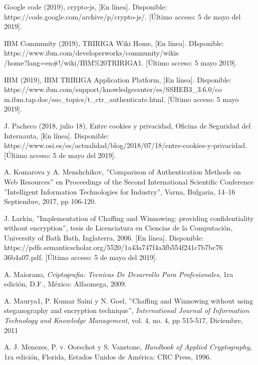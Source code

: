 \documentclass[12pt, a4paper, titlepage]{report}
\begin{document}
\begin{thebibliography}{20}
        Google code (2019), crypto-js, [En línea]. Disponible: https://code.google.com/archive/p/crypto-js/. [Último acceso: 5 de mayo del 2019].
		
        IBM Community (2019), TRIRIGA Wiki Home, [En línea]. DIsponible: 	https://www.ibm.com/developerworks/community/wikis\\
        /home?lang=en\#!/wiki/IBM\%20TRIRIGA1. [Último acceso: 5 mayo 2019].
        
        IBM (2019), IBM TRIRIGA Application Platform, [En línea]. Disponible: https://www.ibm.com/support/knowledgecenter/es/SSHEB3\_3.6.0/co m.ibm.tap.doc/sso\_topics/t\_ctr\_authenticate.html. [Último acceso: 5 mayo 2019].
		
		J. Pacheco (2018, julio 18), Entre cookies y privacidad,  Oficina de Seguridad del Internauta, [En línea]. Disponible: https://www.osi.es/es/actualidad/blog/2018/07/18/entre-cookies-y-privacidad. [Último acceso: 5 de mayo del 2019].
		
	    A. Komarova y A. Menshchikov, ''Comparison of Authentication Methods on Web Resources'' en Proceedings of the Second International Scientific Conference ''Intelligent Information Technologies for Industry'', Varna, Bulgaria, 14–16 Septiembre, 2017, pp 106-120.
	    
    	J. Larkin, ''Implementation of Chaffing and Winnowing: providing confidentiality without encryption'', tesis de Licenciatura en Ciencias de la Computación, University of Bath Bath, Inglaterra, 2006. [En línea]. Disponible: 
    	https://pdfs.semanticscholar.org/5520/1a43a747f4a3fb554f241c7b7bc76 36b4a07.pdf. [Último acceso: 5 de mayo del 2019].
		
        A. Maiorano, \textit{Criptografia: Tecnicas De Desarrollo Para Profesionales}, 1ra edición, D.F., México: Alfaomega, 2009.
		
    	A. Maurya1, P. Kumar Saini y N. Goel, ''Chaffing and Winnowing without using steganography and encryption technique'', \textit{International Journal of Information Technology and Knowledge Management}, vol. 4, no. 4, pp 515-517, Diciembre, 2011
		
        A. J. Menezes, P. v. Oorschot y S. Vanstone, \textit{Handbook of Applied Cryptography}, 1ra edición, Florida, Estados Unidos de América: CRC Press, 1996.
		

\end{thebibliography}
\end{document}
